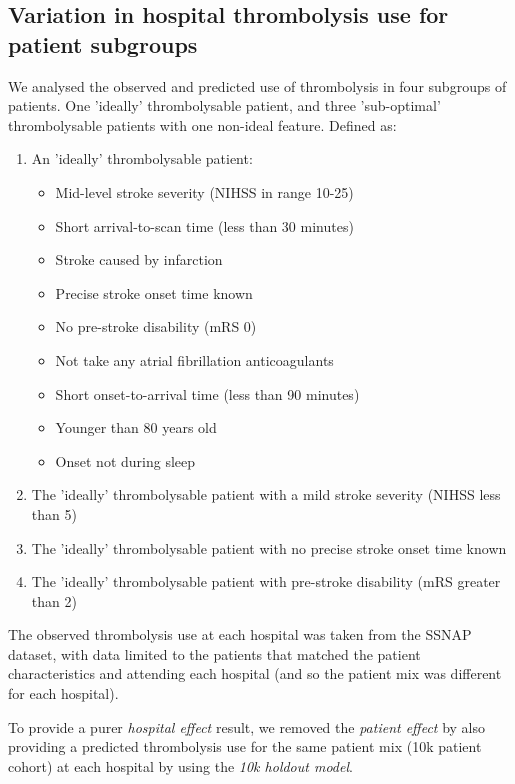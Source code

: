 \subsection{Variation in hospital thrombolysis use for patient subgroups}

We analysed the observed and predicted use of thrombolysis in four subgroups of patients. One 'ideally' thrombolysable patient, and three 'sub-optimal' thrombolysable patients with one non-ideal feature. Defined as:

\begin{enumerate}
  \item An 'ideally' thrombolysable patient:
  \begin{itemize}
    \item Mid-level stroke severity (NIHSS in range 10-25)
    \item Short arrival-to-scan time (less than 30 minutes)
    \item Stroke caused by infarction
    \item Precise stroke onset time known
    \item No pre-stroke disability (mRS 0)
    \item Not take any atrial fibrillation anticoagulants
    \item Short onset-to-arrival time (less than 90 minutes)
    \item Younger than 80 years old
    \item Onset not during sleep
  \end{itemize}
  \item The 'ideally' thrombolysable patient with a mild stroke severity (NIHSS less than 5)
  \item The 'ideally' thrombolysable patient with no precise stroke onset time known
  \item The 'ideally' thrombolysable patient with pre-stroke disability (mRS greater than 2)
\end{enumerate}

The observed thrombolysis use at each hospital was taken from the SSNAP dataset, with data limited to the patients that matched the patient characteristics and attending each hospital (and so the patient mix was different for each hospital).

To provide a purer \emph{hospital effect} result, we removed the \emph{patient effect} by also providing a predicted thrombolysis use for the same patient mix (10k patient cohort) at each hospital by using the \emph{10k holdout model}.

